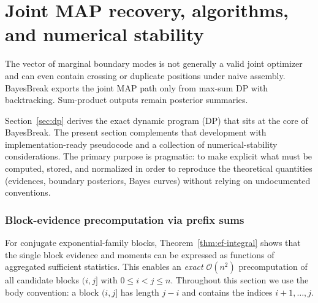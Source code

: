 \chapter{Joint MAP recovery, algorithms, and numerical stability}
\label{ch:map}
\label{app:max-sum-proof}
\label{app:complexity-proofs}

\begin{statusbox}
The vector of marginal boundary modes is not generally a valid joint optimizer and can even contain
crossing or duplicate positions under naive assembly. BayesBreak exports the joint MAP path only
from max-sum DP with backtracking. Sum-product outputs remain posterior summaries.
\end{statusbox}
\label{sec:algorithms}

Section~\ref{sec:dp} derives the exact dynamic program (DP) that sits at the core of BayesBreak.
The present section complements that development with implementation-ready pseudocode and a
collection of numerical-stability considerations.
The primary purpose is pragmatic: to make explicit what must be computed, stored, and
normalized in order to reproduce the theoretical quantities (evidences, boundary posteriors,
Bayes curves) without relying on undocumented conventions.

\subsection{Block-evidence precomputation via prefix sums}
\label{sec:alg-blocks}

For conjugate exponential-family blocks, Theorem~\ref{thm:ef-integral} shows that the single
block evidence and moments can be expressed as functions of aggregated sufficient statistics.
This enables an \emph{exact} $\mathcal{O}(n^2)$ precomputation of all candidate blocks $(i,j]$
with $0\le i<j\le n$. Throughout this section we use the body convention: a block $(i,j]$ has
length $j-i$ and contains the indices $i+1,\dots,j$.

